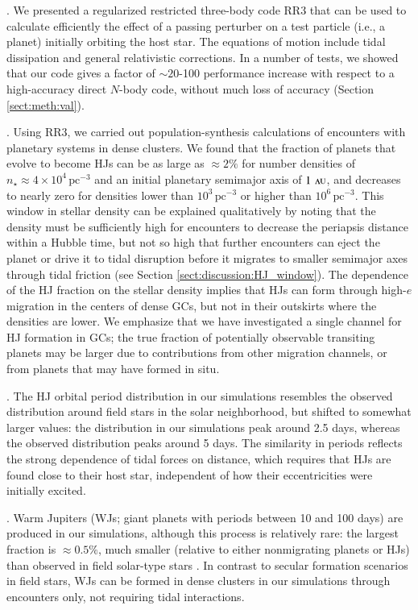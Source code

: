 \documentclass[iop,usenatbib]{emulateapj}
\renewcommand{\S}{Section}
\newcommand{\au}{\,\textsc{au}}
\begin{document}
\medskip {}. We presented a regularized restricted three-body code RR3 that can be used to calculate efficiently the effect of a passing perturber on a test particle (i.e., a planet) initially orbiting the host star. The equations of motion include tidal dissipation and general relativistic corrections. In a number of tests, we showed that our code gives a factor of $\sim 20$-100 performance increase with respect to a high-accuracy direct $N$-body code, without much loss of accuracy (\S\,\ref{sect:meth:val}).

\medskip {}. Using RR3, we carried out population-synthesis calculations of encounters with planetary systems in dense clusters. We found that the fraction of planets that evolve to become HJs can be as large as $\approx 2\%$ for number densities of $n_\star\approx4\times10^4\,\mathrm{pc^{-3}}$ and an initial planetary semimajor axis of $1\,\au$, and decreases to nearly zero for densities lower than  $10^3\,\mathrm{pc^{-3}}$ or higher than $10^6\,\mathrm{pc^{-3}}$. This window in stellar density can be explained qualitatively by noting that the density must be sufficiently high for encounters to decrease the periapsis distance within a Hubble time, but not so high that further encounters can eject the planet or drive it to tidal disruption before it migrates to smaller semimajor axes through tidal friction (see Section \ref{sect:discussion:HJ_window}). The dependence of the HJ fraction on the stellar density implies that HJs can form through high-$e$ migration in the centers of dense GCs, but not in their outskirts where the densities are lower. We emphasize that we have investigated a single channel for HJ formation in GCs; the true fraction of potentially observable transiting planets may be larger due to contributions from other migration channels, or from planets that may have formed in situ. 

\medskip {}. The HJ orbital period distribution in our simulations resembles the observed distribution around field stars in the solar neighborhood, but shifted to somewhat larger values:  the distribution in our simulations peak around 2.5 days, whereas the observed distribution peaks around 5 days. The similarity in periods reflects the strong dependence of tidal forces on distance, which requires that HJs are found close to their host star, independent of how their eccentricities were initially excited. 

\medskip {}. Warm Jupiters (WJs; giant planets with periods between 10 and 100 days) are produced in our simulations, although this process is relatively rare: the largest fraction is $\approx 0.5\%$, much smaller (relative to either nonmigrating planets or HJs) than observed in field solar-type stars \citep{2016A&A...587A..64S}. In contrast to secular formation scenarios in field stars, WJs can be formed in dense clusters in our simulations through encounters only, not requiring tidal interactions.
\end{document}
